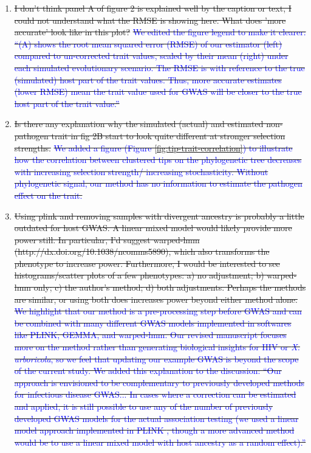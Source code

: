 \documentclass[12pt]{article} %
\providecommand{\DIFdel}[1]{{\protect\color{red}\sout{#1}}}                      %
\begin{document}
\begin{enumerate}
\item%
\DIFdel{I don't think panel A of figure 2 is explained well by the caption or text, I could not understand what the RMSE is showing here. What does 'more accurate' look like in this plot? }%
\DIFdel{\textcolor{blue}{We edited the figure legend to make it clearer: ``(A) shows the root mean squared error (RMSE) of our estimator (left) compared to un-corrected trait values, scaled by their mean (right) under each simulated evolutionary scenario. The RMSE is with reference to the true (simulated) host part of the trait values. Thus, more accurate estimates (lower RMSE) mean the trait value used for GWAS will be closer to the true host part of the trait value.''}
    }%
\item%
\DIFdel{Is there any explanation why the simulated (actual) and estimated non-pathogen trait in fig 2B start to look quite different at stronger selection strengths. }%
\DIFdel{\textcolor{blue}{We added a figure (Figure \ref{fig:tip-trait-correlation}) to illustrate how the correlation between clustered tips on the phylogenetic tree decreases with increasing selection strength/ increasing stochasticity. Without phylogenetic signal, our method has no information to estimate the pathogen effect on the trait.}
    }%
\item%
\DIFdel{Using plink and removing samples with divergent ancestry is probably a little outdated for host GWAS. A linear mixed model would likely provide more power still. In particular, I'd suggest warped-lmm (http://dx.doi.org/10.1038/ncomms5890), which also transforms the phenotype to increase power. Furthermore, I would be interested to see histograms/scatter plots of a few phenotypes: a) no adjustment; b) warped-lmm only; c) the author's method; d) both adjustments. Perhaps the methods are similar, or using both does increases power beyond either method alone. }%
\DIFdel{\textcolor{blue}{We highlight that our method is a pre-processing step before GWAS and can be combined with many different GWAS models implemented in softwares like PLINK, GEMMA, and warped-lmm. Our revised manuscript focuses more on the method rather than generating biological insights for HIV or \emph{X. arboricola}, so we feel that updating our example GWAS is beyond the scope of the current study. We added this explanation to the discussion: ``Our approach is envisioned to be complementary to previously developed methods for infectious disease GWAS... In cases where a correction can be estimated and applied, it is still possible to use any of the number of previously developed GWAS models for the actual association testing (we used a linear model approach implemented in PLINK \citep{Chang2015}, though a more advanced method would be to use a linear mixed model with host ancestry as a random effect).''}
}
\end{enumerate}%
\end{document}
